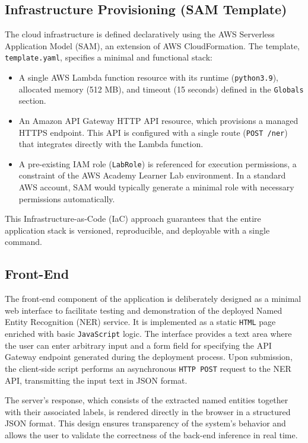 \documentclass[11pt,a4paper]{article}
\begin{document}
\subsection{Infrastructure Provisioning (SAM Template)}
The cloud infrastructure is defined declaratively using the AWS Serverless Application Model (SAM), an extension of AWS CloudFormation. The template, \texttt{template.yaml}, specifies a minimal and functional stack:
\begin{itemize}
    \item A single AWS Lambda function resource with its runtime (\texttt{python3.9}), allocated memory (512 MB), and timeout (15 seconds) defined in the \texttt{Globals} section.
    \item An Amazon API Gateway HTTP API resource, which provisions a managed HTTPS endpoint. This API is configured with a single route (\texttt{POST /ner}) that integrates directly with the Lambda function.
    \item A pre-existing IAM role (\texttt{LabRole}) is referenced for execution permissions, a constraint of the AWS Academy Learner Lab environment. In a standard AWS account, SAM would typically generate a minimal role with necessary permissions automatically.
\end{itemize}
This Infrastructure-as-Code (IaC) approach guarantees that the entire application stack is versioned, reproducible, and deployable with a single command.

\subsection{Front-End}
The front-end component of the application is deliberately designed as a minimal web interface to facilitate testing and demonstration of the deployed Named Entity Recognition (NER) service. It is implemented as a static \texttt{HTML} page enriched with basic \texttt{JavaScript} logic. The interface provides a text area where the user can enter arbitrary input and a form field for specifying the API Gateway endpoint generated during the deployment process. Upon submission, the client-side script performs an asynchronous \texttt{HTTP POST} request to the NER API, transmitting the input text in JSON format.

The server's response, which consists of the extracted named entities together with their associated labels, is rendered directly in the browser in a structured JSON format. This design ensures transparency of the system's behavior and allows the user to validate the correctness of the back-end inference in real time.
\end{document}
